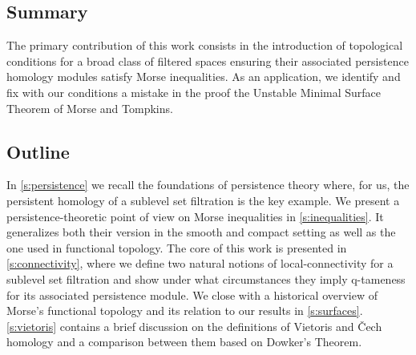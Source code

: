 \subsection*{Summary}

The primary contribution of this work consists in the introduction of topological conditions for a broad class of filtered spaces ensuring their associated persistence homology modules satisfy Morse inequalities.
As an application, we identify and fix with our conditions a mistake in the proof the Unstable Minimal Surface Theorem of Morse and Tompkins. 

\subsection*{Outline}

In \cref{s:persistence} we recall the foundations of persistence theory where, for us, the persistent homology of a sublevel set filtration is the key example.
We present a persistence-theoretic point of view on Morse inequalities in \cref{s:inequalities}.
It generalizes both their version in the smooth and compact setting as well as the one used in functional topology.
The core of this work is presented in \cref{s:connectivity}, where we define two natural notions of local-connectivity for a sublevel set filtration and show under what circumstances they imply q-tameness for its associated persistence module.
We close with a historical overview of Morse's functional topology and its relation to our results in \cref{s:surfaces}.
\cref{s:vietoris} contains a brief discussion on the definitions of Vietoris and \v{C}ech homology and a comparison between them based on Dowker's Theorem.